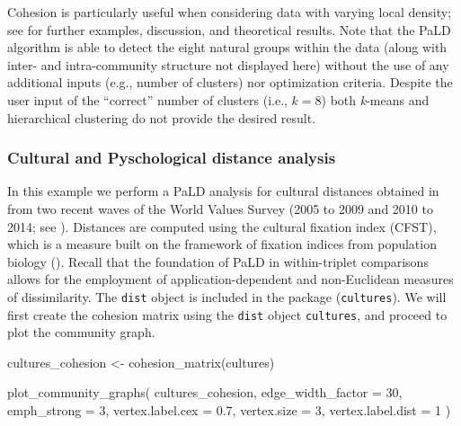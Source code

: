 Cohesion is particularly useful when considering data with varying local
density; see \citet{berenhaut2022social} for further examples,
discussion, and theoretical results. Note that the PaLD algorithm is
able to detect the eight natural groups within the data (along with
inter- and intra-community structure not displayed here) without the use
of any additional inputs (e.g., number of clusters) nor optimization
criteria. Despite the user input of the ``correct'' number of clusters
(i.e., \(k = 8\)) both \emph{k}-means and hierarchical clustering do not
provide the desired result.

\hypertarget{cultural-and-pyschological-distance-analysis}{%
\subsubsection{Cultural and Pyschological distance
analysis}\label{cultural-and-pyschological-distance-analysis}}

In this example we perform a PaLD analysis for cultural distances
obtained in \citet{muthukrishna2020beyond} from two recent waves of the
World Values Survey (2005 to 2009 and 2010 to 2014; see
\citet{inglehart2014world}). Distances are computed using the cultural
fixation index (CFST), which is a measure built on the framework of
fixation indices from population biology
(\citet{bell2009culture,cavalli1994history}). Recall that the foundation
of PaLD in within-triplet comparisons allows for the employment of
application-dependent and non-Euclidean measures of dissimilarity. The
\texttt{dist} object is included in the  package
(\texttt{cultures}). We will first create the cohesion matrix using the
\texttt{dist} object \texttt{cultures}, and proceed to plot the
community graph.

\begin{Schunk}
\begin{Sinput}
cultures_cohesion <- cohesion_matrix(cultures)
\end{Sinput}
\end{Schunk}

\begin{Schunk}
\begin{Sinput}
plot_community_graphs(
  cultures_cohesion,
  edge_width_factor = 30,
  emph_strong = 3,
  vertex.label.cex = 0.7,
  vertex.size = 3,
  vertex.label.dist = 1
)
\end{Sinput}
\end{Schunk}

